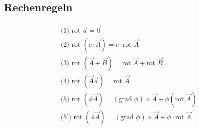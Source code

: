 \documentclass[a4paper,10pt]{scrartcl}
\begin{document}
        \subsection*{Rechenregeln}
        \begin{equation*}
            \begin{aligned}
                & \text{(1) rot }  \vec{a} = \vec{0} \\
                & \text{(2) rot }  (c \cdot \vec{A}) = c \cdot \text{rot } \vec{A} \\
                & \text{(3) rot }  (\vec{A} + \vec{B}) = \text{rot } \vec{A} + \text{rot } \vec{B} \\
                & \text{(4) rot }  (\vec{A} \vec{a}) = \text{rot } \vec{A} \\
                & \text{(5) rot }  (\phi \vec{A})= (\text{grad }  \phi) \times \vec{A} + \phi(\text{rot } \vec{A}) \\
                & \text{(5') rot }  (\phi \vec{A})= (\text{grad }  \phi) \times \vec{A} + \phi \cdot \text{rot } \vec{A} \\
            \end{aligned}
        \end{equation*}
\end{document}
